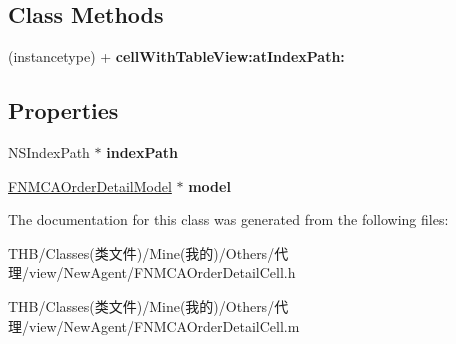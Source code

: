 \subsection*{Class Methods}
\begin{DoxyCompactItemize}
\item 
\mbox{\label{interface_f_n_m_c_a_order_detail_cell_a67e7f14d81194dc591ef9998a9fe83e4}} 
(instancetype) + {\bfseries cell\+With\+Table\+View\+:at\+Index\+Path\+:}
\end{DoxyCompactItemize}
\subsection*{Properties}
\begin{DoxyCompactItemize}
\item 
\mbox{\label{interface_f_n_m_c_a_order_detail_cell_a7db5582add9d57f4025828d1a54dd996}} 
N\+S\+Index\+Path $\ast$ {\bfseries index\+Path}
\item 
\mbox{\label{interface_f_n_m_c_a_order_detail_cell_a5b32e6f1942ba1b778cdd08027a471dc}} 
\mbox{\hyperlink{interface_f_n_m_c_a_order_detail_model}{F\+N\+M\+C\+A\+Order\+Detail\+Model}} $\ast$ {\bfseries model}
\end{DoxyCompactItemize}


The documentation for this class was generated from the following files\+:\begin{DoxyCompactItemize}
\item 
T\+H\+B/\+Classes(类文件)/\+Mine(我的)/\+Others/代理/view/\+New\+Agent/F\+N\+M\+C\+A\+Order\+Detail\+Cell.\+h\item 
T\+H\+B/\+Classes(类文件)/\+Mine(我的)/\+Others/代理/view/\+New\+Agent/F\+N\+M\+C\+A\+Order\+Detail\+Cell.\+m\end{DoxyCompactItemize}
